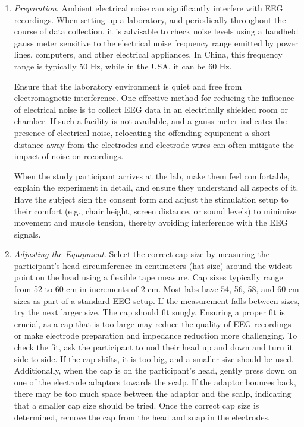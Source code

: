 \documentclass[journal,twocolumn]{IEEEtran}
\begin{document}
\begin{enumerate}
\item \emph{Preparation}.
Ambient electrical noise can significantly interfere with EEG recordings. When setting up a laboratory, and periodically throughout the course of data collection, it is advisable to check noise levels using a handheld gauss meter sensitive to the electrical noise frequency range emitted by power lines, computers, and other electrical appliances. In China, this frequency range is typically 50 Hz, while in the USA, it can be 60 Hz.

Ensure that the laboratory environment is quiet and free from electromagnetic interference. One effective method for reducing the influence of electrical noise is to collect EEG data in an electrically shielded room or chamber. If such a facility is not available, and a gauss meter indicates the presence of electrical noise, relocating the offending equipment a short distance away from the electrodes and electrode wires can often mitigate the impact of noise on recordings.

When the study participant arrives at the lab, make them feel comfortable, explain the experiment in detail, and ensure they understand all aspects of it. Have the subject sign the consent form and adjust the stimulation setup to their comfort (e.g., chair height, screen distance, or sound levels) to minimize movement and muscle tension, thereby avoiding interference with the EEG signals.

\item \emph{Adjusting the Equipment}.
Select the correct cap size by measuring the participant's head circumference in centimeters (hat size) around the widest point on the head using a flexible tape measure. Cap sizes typically range from 52 to 60 cm in increments of 2 cm. Most labs have 54, 56, 58, and 60 cm sizes as part of a standard EEG setup. If the measurement falls between sizes, try the next larger size. The cap should fit snugly. Ensuring a proper fit is crucial, as a cap that is too large may reduce the quality of EEG recordings or make electrode preparation and impedance reduction more challenging. To check the fit, ask the participant to nod their head up and down and turn it side to side. If the cap shifts, it is too big, and a smaller size should be used. Additionally, when the cap is on the participant’s head, gently press down on one of the electrode adaptors towards the scalp. If the adaptor bounces back, there may be too much space between the adaptor and the scalp, indicating that a smaller cap size should be tried. Once the correct cap size is determined, remove the cap from the head and snap in the electrodes.


\end{enumerate}
\end{document}
